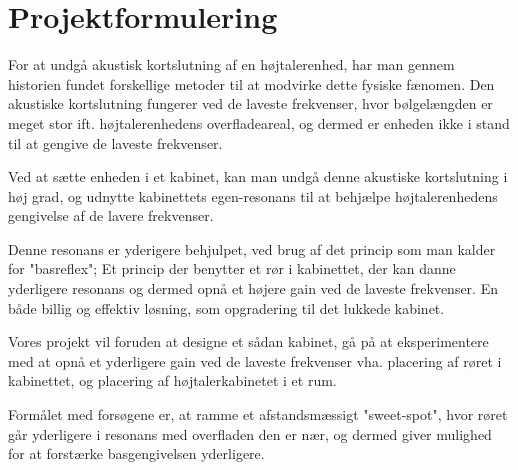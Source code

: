 \chapter{Projektformulering}

For at undgå akustisk kortslutning af en højtalerenhed, har man gennem historien fundet forskellige metoder til at modvirke dette fysiske fænomen. 
Den akustiske kortslutning fungerer ved de laveste frekvenser, hvor bølgelængden er meget stor ift. højtalerenhedens overfladeareal, og dermed er enheden ikke i stand til at gengive de laveste frekvenser.

Ved at sætte enheden i et kabinet, kan man undgå denne akustiske kortslutning i høj grad, og udnytte kabinettets egen-resonans til at behjælpe højtalerenhedens gengivelse af de lavere frekvenser. 

Denne resonans er yderigere behjulpet, ved brug af det princip som man kalder for "basreflex"; Et princip der benytter et rør i kabinettet, der kan danne yderligere resonans og dermed opnå et højere gain ved de laveste frekvenser. En både billig og effektiv løsning, som opgradering til det lukkede kabinet. 

Vores projekt vil foruden at designe et sådan kabinet, gå på at eksperimentere med at opnå et yderligere gain ved de laveste frekvenser vha. placering af røret i kabinettet, og placering af højtalerkabinetet i et rum. 

Formålet med forsøgene er, at ramme et afstandsmæssigt "sweet-spot", hvor røret går yderligere i resonans med overfladen den er nær, og dermed giver mulighed for at forstærke basgengivelsen yderligere.  

